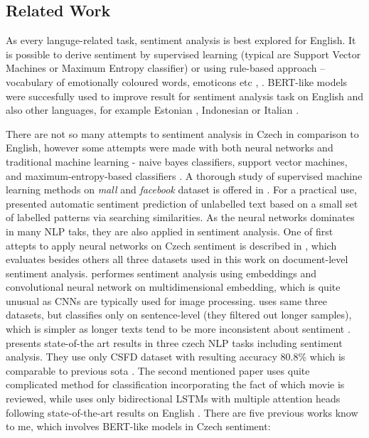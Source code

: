 \subsection{Related Work}
As every languge-related task, sentiment analysis is best explored for English. It is possible to derive sentiment by supervised learning (typical are Support Vector Machines or Maximum Entropy classifier) or using rule-based approach -- vocabulary of emotionally coloured words, emoticons etc \citep{Cano2019}, \citep{Veselovska}. BERT-like models were succesfully used to improve result for sentiment analysis task on English \citep{Devlin2019} and also other languages, for example Estonian \citep{Kittask2020}, Indonesian \citep{putra} or Italian \citep{pota2021effective}.
\par
There are not so many attempts to sentiment analysis in Czech in comparison to English, however some attempts were made with both neural networks and traditional machine learning - naive bayes classifiers, support vector machines, and maximum-entropy-based classifiers \citep{Veselovska}.  A thorough study of supervised machine learning methods on \textit{mall} and \textit{facebook} dataset is offered in \citep{Cano2019}. For a practical use, \citep{Zizka} presented automatic sentiment prediction of unlabelled text based on a small set of labelled patterns via searching similarities. As the neural networks dominates in many NLP taks, they are also applied in sentiment analysis. One of first attepts to apply neural networks on Czech sentiment is described in \citep{Lenc}, which evaluates besides others all three datasets used in this work on document-level sentiment analysis. \citep{kysely} performes sentiment analysis using embeddings and convolutional neural network on multidimensional embedding, which is quite unusual as CNNs are typically used for image processing. \citep{kysely} uses same three datasets, but classifies only on sentence-level (they filtered out longer samples), which is simpler as longer texts tend to be more inconsistent about sentiment \citep{Veselovska}. \citep{Libovicky} presents state-of-the art results in three czech NLP tasks including sentiment analysis. They use only CSFD dataset with resulting accuracy 80.8\% which is comparable to previous \acrshort{sota} \citep{Brychcin2013}. The second mentioned paper uses quite complicated method for classification incorporating the fact of which movie is reviewed, while \citep{Libovicky} uses only bidirectional LSTMs with multiple attention heads following state-of-the-art results on English \citep{Lin2017}. There are five previous works know to me, which involves BERT-like models in Czech sentiment: 
